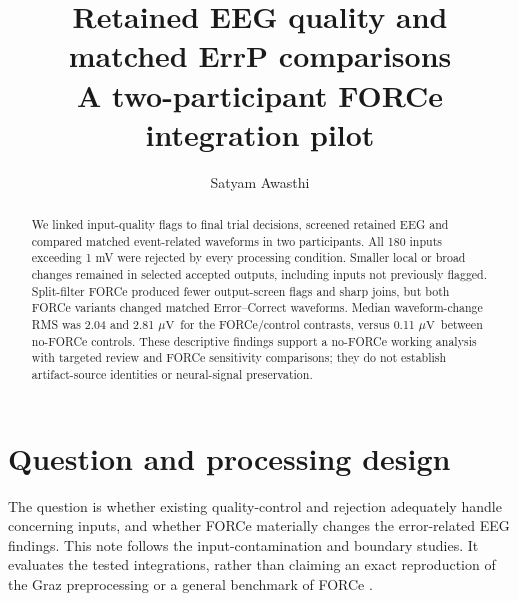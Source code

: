 \documentclass[11pt,a4paper]{article}
\title{Retained EEG quality and matched ErrP comparisons\\\large A two-participant FORCe integration pilot}
\author{Satyam Awasthi}\date{}
\newcommand{\uv}{\ensuremath{\mu\mathrm{V}}}
\begin{document}
\maketitle
\begin{abstract}
We linked input-quality flags to final trial decisions, screened retained EEG and compared matched event-related waveforms in two participants. All 180 inputs exceeding 1 mV were rejected by every processing condition. Smaller local or broad changes remained in selected accepted outputs, including inputs not previously flagged. Split-filter FORCe produced fewer output-screen flags and sharp joins, but both FORCe variants changed matched Error--Correct waveforms. Median waveform-change RMS was 2.04 and 2.81 \uv\ for the FORCe/control contrasts, versus 0.11 \uv\ between no-FORCe controls. These descriptive findings support a no-FORCe working analysis with targeted review and FORCe sensitivity comparisons; they do not establish artifact-source identities or neural-signal preservation.
\end{abstract}
\section{Question and processing design}
The question is whether existing quality-control and rejection adequately handle concerning inputs, and whether FORCe materially changes the error-related EEG findings. This note follows the input-contamination and boundary studies. It evaluates the tested integrations, rather than claiming an exact reproduction of the Graz preprocessing \cite{graz} or a general benchmark of FORCe \cite{force}.
\end{document}
